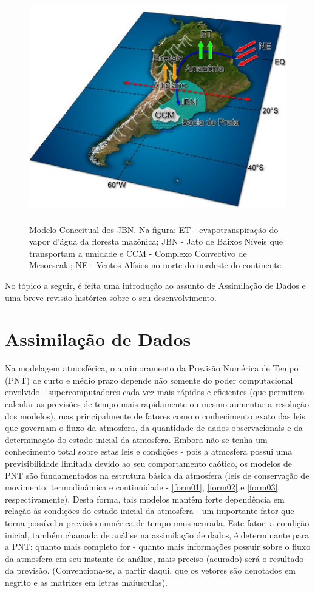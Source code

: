 \begin{figure}[!hbp]
\includegraphics[height=10cm]{./figs/fig10.png}
\caption{Modelo Conceitual dos JBN. Na figura: ET - evapotranspiração do vapor d'água da floresta mazônica; JBN - Jato de Baixos Níveis que transportam a umidade e CCM - Complexo Convectivo de Mesoescala; NE - Ventos Alísios no norte do nordeste do continente.}
\label{fig10}
\end{figure}

No tópico a seguir, é feita uma introdução ao assunto de Assimilação de Dados e uma breve revisão histórica sobre o seu desenvolvimento.

\section{Assimilação de Dados}
\label{ss:assimdados}

Na modelagem atmosférica, o aprimoramento da Previsão Numérica de Tempo (PNT) de curto e médio prazo depende não somente do poder computacional envolvido - supercomputadores cada vez mais rápidos e eficientes (que permitem calcular as previsões de tempo mais rapidamente ou mesmo aumentar a resolução dos modelos), mas principalmente de fatores como o conhecimento exato das leis que governam o fluxo da atmosfera, da quantidade de dados observacionais e da determinação do estado inicial da atmosfera.  Embora não se tenha um conhecimento total sobre estas leis e condições - pois a atmosfera possui uma previsibilidade limitada devido ao seu comportamento caótico, os modelos de PNT são fundamentados na estrutura básica da atmosfera (leis de conservação de movimento, termodinâmica e continuidade - \autoref{form01}, \autoref{form02} e \autoref{form03}, respectivamente). Desta forma, tais modelos mantêm forte dependência em relação às condições do estado inicial da atmosfera - um importante fator que torna possível a previsão numérica de tempo mais acurada. Este fator, a condição inicial, também chamada de análise na assimilação de dados, é determinante para a PNT: quanto mais completo for - quanto mais informações possuir sobre o fluxo da atmosfera em seu instante de análise, mais preciso (acurado) será o resultado da previsão. (Convenciona-se, a partir daqui, que os vetores são denotados em negrito e as matrizes em letras maiúsculas).

